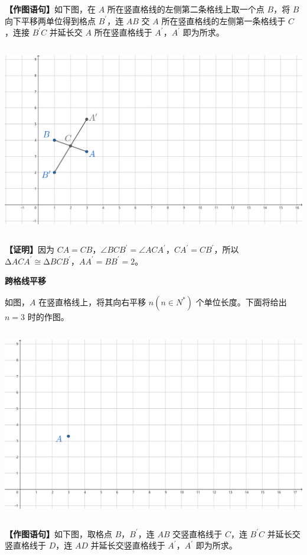 \documentclass[UTF8]{article}
\begin{document}
\textbf{【作图语句】}如下图，在 \(A\)
所在竖直格线的左侧第二条格线上取一个点 \(B\)，将 \(B\)
向下平移两单位得到格点 \(B^{'}\)，连 \(AB\) 交 \(A\)
所在竖直格线的左侧第一条格线于 \(C\)，连接 \(B^{'}C\) 并延长交 \(A\)
所在竖直格线于 \(A^{'}\)，\(A^{'}\) 即为所求。

\includegraphics[width=5.76806in,height=3.27847in]{media/image15.png}

\textbf{【证明】}因为
\(CA = CB\)，\(\angle BCB^{'} = \angle ACA^{'}\)，\(CA^{'} = CB^{'}\)，所以
\(\mathrm{\Delta}ACA^{'} \cong \mathrm{\Delta}BCB^{'}\)，\(AA^{'} = BB^{'} = 2\)。

\textbf{跨格线平移}

如图，\(A\) 在竖直格线上，将其向右平移 \(n\left( n \in N^{*} \right)\)
个单位长度。下面将给出 \(n = 3\) 时的作图。

\includegraphics[width=5.76806in,height=3.27847in]{media/image14.png}

\textbf{【作图语句】}如下图，取格点 \(B\)，\(B^{'}\)，连 \(AB\)
交竖直格线于 \(C\)，连 \(B^{'}C\) 并延长交竖直格线于 \(D\)，连 \(AD\)
并延长交竖直格线于 \(A^{'}\)，\(A^{'}\) 即为所求。
\end{document}
